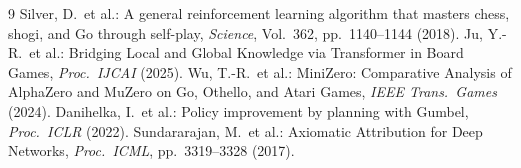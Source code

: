 \documentclass[a4paper,10pt,twocolumn]{ltjsarticle}
\begin{document}
\begin{thebibliography}{9}
\small
{} Silver, D.\ et al.: A general reinforcement learning
  algorithm that masters chess, shogi, and Go through self-play,
  \textit{Science}, Vol.~362, pp.~1140--1144 (2018).
 Ju, Y.-R.\ et al.: Bridging Local and Global Knowledge via
  Transformer in Board Games, \textit{Proc.\ IJCAI} (2025).
 Wu, T.-R.\ et al.: MiniZero: Comparative Analysis of
  AlphaZero and MuZero on Go, Othello, and Atari Games,
  \textit{IEEE Trans.\ Games} (2024).
 Danihelka, I.\ et al.: Policy improvement by planning with
  Gumbel, \textit{Proc.\ ICLR} (2022).
 Sundararajan, M.\ et al.: Axiomatic Attribution for Deep Networks,
  \textit{Proc.\ ICML}, pp.~3319--3328 (2017).
\end{thebibliography}
\end{document}
